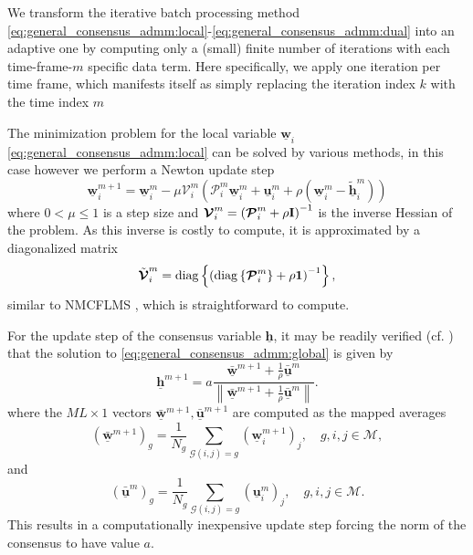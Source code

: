 \documentclass{article}
\newcommand{\hf}{\underline{\bm{h}}}
\newcommand{\wf}{\underline{\bm{w}}}
\newcommand{\uuf}{\underline{\bm{u}}}
\newcommand{\aRhof}{\bm{\mathcal{P}}}
\newcommand{\I}{\mtxb{I}}
\newcommand{\Mset}{\mathcal{M}}
\begin{document}
We transform the iterative batch processing method \eqref{eq:general_consensus_admm:local}-\eqref{eq:general_consensus_admm:dual} into an adaptive one by computing only a (small) finite number of iterations with each time-frame-\(m\) specific data term.
Here specifically, we apply one iteration per time frame, which manifests itself as simply replacing the iteration index \(k\) with the time index \(m\)

The minimization problem for the local variable \(\wf_i\) \eqref{eq:general_consensus_admm:local} can be solved by various methods, in this case however we perform a Newton update step
\begin{equation}
    \wf_i^{m+1} = \wf_i^{m} - \mu \bm{\mathcal{V}}_i^m \left( \aRhof_i^m \wf_i^m + \uuf_i^m + \rho\left(\wf_i^m - \tilde{\hf}_i^{m}\right)\right)\label{eq:online_admm:local_update}
\end{equation}
where \(0  < \mu\leq 1\) is a step size and \(\bm{\mathcal{V}}_i^m = \left(\aRhof_i^m + \rho \I \right)^{-1}\) is the inverse Hessian of the problem.
As this inverse is costly to compute, it is approximated by a diagonalized matrix
\begin{equation}
    \tilde{\bm{\mathcal{V}}}_i^m = \operatorname{diag} \left\{ \left( \operatorname{diag} \left\{ \aRhof_i^m \right\} + \rho \mtxb{1} \right)^{-1}\right\},
\end{equation}
similar to NMCFLMS \cite{huangClassFrequencydomainAdaptive2003}, which is straightforward to compute.

For the update step of the consensus variable \(\hf\), it may be readily verified (cf. \cite{boydDistributedOptimizationStatistical2011}) that the solution to \eqref{eq:general_consensus_admm:global} is given by
\begin{equation}
    \hf^{m+1} = a\frac{\bar{\wf}^{m+1} + \frac{1}{\rho} \bar{\uuf}^{m} }{\left\| \bar{\wf}^{m+1} + \frac{1}{\rho} \bar{\uuf}^{m} \right\|}.\label{eq:online_admm:consensus_update}
\end{equation}
where the \(M L \times 1\) vectors \(\bar{\wf}^{m+1}, \bar{\uuf}^{m+1}\) are computed as the mapped averages
\begin{equation}
    (\bar{\wf}^{m+1})_g = \frac{1}{N_g} \sum_{\mathcal{G}(i,j)=g} (\wf_i^{m+1})_j,\quad g,i,j \in \Mset,
\end{equation}
and
\begin{equation}
    (\bar{\uuf}^{m})_g = \frac{1}{N_g} \sum_{\mathcal{G}(i,j)=g} (\uuf_i^{m})_j,\quad g,i,j \in \Mset.
\end{equation}
This results in a computationally inexpensive update step forcing the norm of the consensus to have value \(a\).
\end{document}
